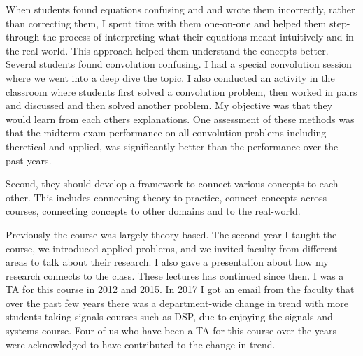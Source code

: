 \documentclass[10pt]{article}
\begin{document}
When students found equations confusing and and wrote them incorrectly, rather than correcting them, I spent time with them one-on-one and helped them step-through the process of interpreting what their equations meant intuitively and in the real-world. This approach helped them understand the concepts better. Several students found convolution confusing. I had a special convolution session where we went into a deep dive the topic. I also conducted an activity in the classroom where students first solved a convolution problem, then worked in pairs and discussed and then solved another problem. My objective was that they would learn from each others explanations. One assessment of these methods was that the midterm exam performance on all convolution problems including theretical and applied, was significantly better than the performance over the past years. %

Second, they should develop a framework to connect various concepts to each other. This includes connecting theory to practice, connect concepts across courses, connecting concepts to other domains and to the real-world.

Previously the course was largely theory-based. The second year I taught the course, we introduced applied problems, and we invited faculty from different areas to talk about their research. I also gave a presentation about how my research connects to the class. These lectures has continued since then. I was a TA for this course in 2012 and 2015. In 2017 I got an email from the faculty that over the past few years there was a department-wide change in trend with more students taking signals courses such as DSP, due to enjoying the signals and systems course. Four of us who have been a TA for this course over the years were acknowledged to have contributed to the change in trend.\\
\end{document}
